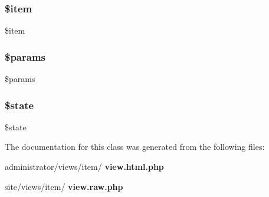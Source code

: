 \subsubsection{\$item}
{\footnotesize\ttfamily \$item\hspace{0.3cm}{\ttfamily [protected]}}

\mbox{\label{classtks__agenda_view_item_afe68e6fbe7acfbffc0af0c84a1996466}} 
\subsubsection{\$params}
{\footnotesize\ttfamily \$params\hspace{0.3cm}{\ttfamily [protected]}}

\mbox{\label{classtks__agenda_view_item_ae82306c4f2d17d8dd5c7d8d916b33bed}} 
\subsubsection{\$state}
{\footnotesize\ttfamily \$state\hspace{0.3cm}{\ttfamily [protected]}}



The documentation for this class was generated from the following files\+:\begin{DoxyCompactItemize}
\item 
administrator/views/item/\textbf{ view.\+html.\+php}\item 
site/views/item/\textbf{ view.\+raw.\+php}\end{DoxyCompactItemize}

